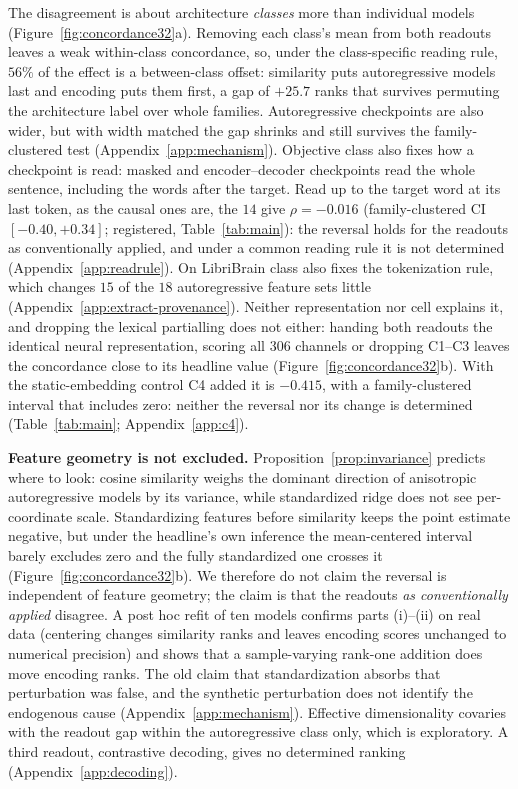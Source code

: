 \documentclass{article}
\begin{document}
The disagreement is about architecture \emph{classes} more than individual models
(Figure~\ref{fig:concordance32}a). Removing each class's mean from both readouts leaves a weak
within-class concordance, so, under the class-specific reading rule, $56\%$ of the effect is a between-class offset: similarity puts
autoregressive models last and encoding puts them first, a gap of $+25.7$ ranks that survives
permuting the architecture label over whole families. Autoregressive checkpoints are also wider,
but with width matched the gap shrinks and still survives the family-clustered test
(Appendix~\ref{app:mechanism}). Objective class also fixes how a checkpoint is read: masked and
encoder--decoder checkpoints read the whole sentence, including the words after the target. Read up to
the target word at its last token, as the causal ones are, the $14$ give $\rho=-0.016$ (family-clustered
CI $[-0.40, +0.34]$; registered, Table~\ref{tab:main}): the reversal holds for the readouts as
conventionally applied, and under a common reading rule it is not determined (Appendix~\ref{app:readrule}). On LibriBrain class also fixes
the tokenization rule, which changes $15$ of the $18$ autoregressive feature sets little
(Appendix~\ref{app:extract-provenance}). Neither representation nor cell explains it, and dropping the lexical
partialling does not either: handing both readouts the identical neural representation, scoring all
$306$ channels or dropping C1--C3 leaves the concordance close to its headline value
(Figure~\ref{fig:concordance32}b). With the static-embedding control C4 added it is $-0.415$, with a family-clustered
interval that includes zero: neither the reversal nor its change is determined (Table~\ref{tab:main}; Appendix~\ref{app:c4}).

\textbf{Feature geometry is not excluded.} Proposition~\ref{prop:invariance} predicts where to
look: cosine similarity weighs the dominant direction of anisotropic autoregressive models by its
variance, while standardized ridge does not see per-coordinate scale. Standardizing features before
similarity keeps the point estimate negative, but under the headline's own inference the
mean-centered interval barely excludes zero and the fully standardized one crosses it
(Figure~\ref{fig:concordance32}b). We therefore do not claim the reversal is independent of feature
geometry; the claim is that the readouts \emph{as conventionally applied} disagree. A post hoc
refit of ten models confirms parts (i)--(ii) on real data (centering changes similarity ranks and
leaves encoding scores unchanged to numerical precision) and shows that a sample-varying rank-one
addition does move encoding ranks. The old claim that
standardization absorbs that perturbation was false, and the synthetic perturbation
does not identify the endogenous cause (Appendix~\ref{app:mechanism}). Effective dimensionality covaries with
the readout gap within the autoregressive class only, which is exploratory. A third readout,
contrastive decoding, gives no determined ranking (Appendix~\ref{app:decoding}).
\end{document}
